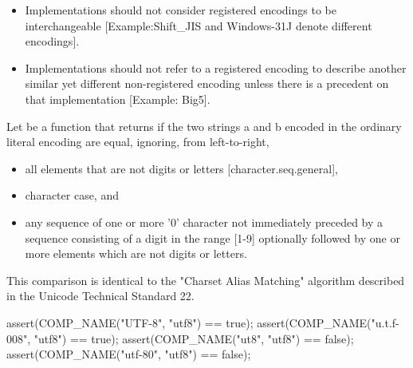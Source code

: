 \documentclass{wg21}
\begin{document}
\begin{addedblock}
\recommended
\begin{itemize}
\item Implementations should not consider registered encodings to be interchangeable [Example:Shift_JIS and Windows-31J denote different encodings].
\item Implementations should not refer to a registered encoding to describe another similar yet different non-registered encoding unless there is a precedent on that implementation [Example: Big5].
\end{itemize}


\pnum Let  be a function that returns  if the two strings a and b encoded in the ordinary literal encoding are equal, ignoring, from left-to-right,
\begin{itemize}
    \item all elements that are not digits or letters [character.seq.general],
    \item character case, and
    \item any sequence of one or more '0' character not immediately preceded by a sequence consisting of a digit in the range [1-9] optionally followed by one or more elements which are not digits or letters.
\end{itemize}

\begin{note}
    This comparison is identical to the "Charset Alias Matching" algorithm described in the Unicode Technical Standard 22.
\end{note}

\begin{example}
\begin{codeblock}
    assert(COMP_NAME("UTF-8", "utf8") == true);
    assert(COMP_NAME("u.t.f-008", "utf8") == true);
    assert(COMP_NAME("ut8", "utf8") == false);
    assert(COMP_NAME("utf-80", "utf8") == false);
\end{codeblock}
\end{example}


\end{addedblock}
\end{document}
